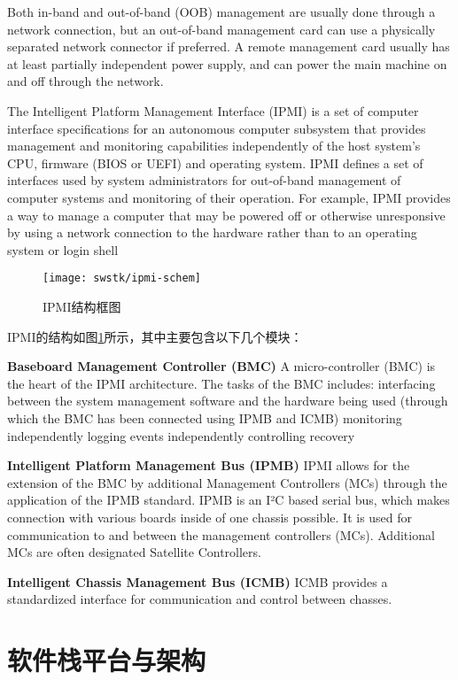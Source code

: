 Both in-band and out-of-band (OOB) management are usually done through a network connection, but an out-of-band management card can use a physically separated network connector if preferred. A remote management card usually has at least partially independent power supply, and can power the main machine on and off through the network.

The Intelligent Platform Management Interface (IPMI) is a set of computer interface specifications for an autonomous computer subsystem that provides management and monitoring capabilities independently of the host system's CPU, firmware (BIOS or UEFI) and operating system. IPMI defines a set of interfaces used by system administrators for out-of-band management of computer systems and monitoring of their operation. For example, IPMI provides a way to manage a computer that may be powered off or otherwise unresponsive by using a network connection to the hardware rather than to an operating system or login shell

\begin{figure}[tbh]
  \centering
  \texttt{[image: swstk/ipmi-schem]}
  \caption{IPMI结构框图}
  \label{fig:ipmi-schem}
\end{figure}

IPMI的结构如图\ref{fig:ipmi-schem}所示，其中主要包含以下几个模块：

\textbf{Baseboard Management Controller (BMC)}\quad
A micro-controller (BMC) is the heart of the IPMI architecture. The tasks of the BMC includes:
interfacing between the system management software and the hardware being used (through which the BMC has been connected using IPMB and ICMB)
monitoring independently
logging events independently
controlling recovery

\textbf{Intelligent Platform Management Bus (IPMB)}\quad
IPMI allows for the extension of the BMC by additional Management Controllers (MCs) through the application of the IPMB standard.
IPMB is an I²C based serial bus, which makes connection with various boards inside of one chassis possible. It is used for communication to and between the management controllers (MCs). Additional MCs are often designated Satellite Controllers.

\textbf{Intelligent Chassis Management Bus (ICMB)}\quad
ICMB provides a standardized interface for communication and control between chasses.


\section{软件栈平台与架构}


